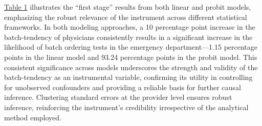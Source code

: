 \documentclass[,,nonblindrev]{informs}
\begin{document}
\hyperref[table:first_stage]{Table 1} illustrates the ``first stage''
results from both linear and probit models, emphasizing the robust
relevance of the instrument across different statistical frameworks. In
both modeling approaches, a 10 percentage point increase in the
batch-tendency of physicians consistently results in a significant
increase in the likelihood of batch ordering tests in the emergency
department---1.15 percentage points in the linear model and 93.24
percentage points in the probit model. This consistent significance
across models underscores the strength and validity of the
batch-tendency as an instrumental variable, confirming its utility in
controlling for unobserved confounders and providing a reliable basis
for further causal inference. Clustering standard errors at the provider
level ensures robust inference, reinforcing the instrument's credibility
irrespective of the analytical method employed.
\end{document}
